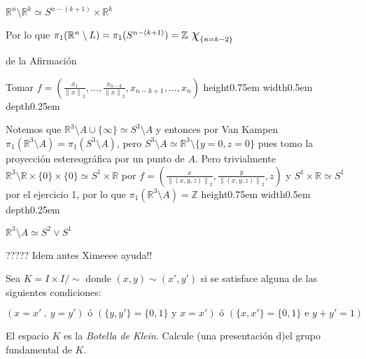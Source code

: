 \documentclass[11pt]{article}
\newcommand{\R}{{\mathbb{R}}}
\newcommand\norm[1]{\left\lVert#1\right\rVert}
\newenvironment{proof}[1][Demostraci\'on]{\begin{trivlist}
\item[\hskip \labelsep {\bfseries #1}]}{\end{trivlist}}
\newenvironment{declaration}[1][Afirmaci\'on]{\begin{trivlist}
\item[\hskip \labelsep {\bfseries #1}]}{\end{trivlist}}
\newcommand{\qed}{\nobreak \ifvmode \relax \else
      \ifdim\lastskip<1.5em \hskip-\lastskip
      \hskip1.5em plus0em minus0.5em \fi \nobreak
      \vrule height0.75em width0.5em depth0.25em\fi}
\newcommand{\Z}{\mathbb{Z}}
\begin{document}
\begin{enumerate}
\begin{proof}
\begin{enumerate}
\begin{declaration}
$\R^n \setminus \R^k \simeq S^{n-(k+1)} \times \R^k$ 
\end{declaration}

Por lo que $\pi_1(\R^n \setminus L) = \pi_1(S^{n-(k+1)}) = \Z \ \mbox{\Large$\chi$}_{\{n=k-2\}}$

\begin{proof} {de la Afirmaci\'on}

Tomar $f = (\frac{x_1}{\norm{x}_2} , \dots , \frac{x_{n-k}}{\norm{x}_2}, x_{n-k+1}  , \dots , x_n)$ \qed

\end{proof}

\item Notemos que $\R^3 \setminus A \cup \{\infty\} \simeq S^3 \setminus A$ y entonces por Van Kampen
$\pi_1(\R^3 \setminus A) = \pi_1(S^3 \setminus A)$, pero $S^3 \setminus A \simeq \R^3 \setminus \{y=0 , z=0\}$ pues tomo la proyecci\'on estereogr\'afica por un punto de $A$. Pero trivialmente $\R^3 \setminus \R \times \{0\} \times \{0\} \simeq S^1 \times \R$ por $f= (\frac{x}{\norm{(x,y,z)}_2} , \frac{y}{\norm{(x,y,z)}_2},z)$ y $ S^1 \times \R \simeq S^1$ por el ejercicio 1, por lo que $\pi_1(\R^3 \setminus A)=\Z$ \qed 

\begin{declaration}
$\R^3 \setminus A \simeq S^2 \vee S^1$
\end{declaration}

\begin{proof}
????? Idem antes Ximeeee ayuda!!
\end{proof}

\end{enumerate}

\end{proof}



\item {
Sea $ K = I \times I / \sim $ donde $ (x,y) \sim (x',y') $ si se satisface alguna de las siguientes condiciones:

$$( x=x' \ , \ y=y') \text{ \'o } ( \{ y,y' \} = \{ 0,1 \} \text{ y } x=x' ) \text{ \'o } ( \{x,x'\} =\{0,1\} \text{ e } y+y'=1 )$$

El espacio $K$ es la {\em Botella de Klein}. Calcule (una presentaci\'on d)el grupo fundamental de $K$.
}


\end{enumerate}
\end{document}
